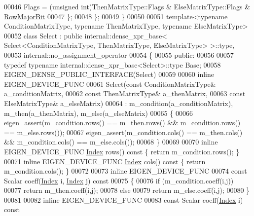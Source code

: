 \begin{DoxyCode}
00046     Flags = (\textcolor{keywordtype}{unsigned} int)ThenMatrixType::Flags & ElseMatrixType::Flags & 
      \hyperlink{group__flags_gae4f56c2a60bbe4bd2e44c5b19cbe8762}{RowMajorBit}
00047   \};
00048 \};
00049 \}
00050 
00051 \textcolor{keyword}{template}<\textcolor{keyword}{typename} ConditionMatrixType, \textcolor{keyword}{typename} ThenMatrixType, \textcolor{keyword}{typename} ElseMatrixType>
00052 \textcolor{keyword}{class }Select : \textcolor{keyword}{public} internal::dense\_xpr\_base< Select<ConditionMatrixType, ThenMatrixType, ElseMatrixType>
       >::type,
00053                internal::no\_assignment\_operator
00054 \{
00055   \textcolor{keyword}{public}:
00056 
00057     \textcolor{keyword}{typedef} \textcolor{keyword}{typename} internal::dense\_xpr\_base<Select>::type Base;
00058     EIGEN\_DENSE\_PUBLIC\_INTERFACE(Select)
00059 
00060     \textcolor{keyword}{inline} EIGEN\_DEVICE\_FUNC
00061     Select(\textcolor{keyword}{const} ConditionMatrixType& a\_conditionMatrix,
00062            \textcolor{keyword}{const} ThenMatrixType& a\_thenMatrix,
00063            \textcolor{keyword}{const} ElseMatrixType& a\_elseMatrix)
00064       : m\_condition(a\_conditionMatrix), m\_then(a\_thenMatrix), m\_else(a\_elseMatrix)
00065     \{
00066       eigen\_assert(m\_condition.rows() == m\_then.rows() && m\_condition.rows() == m\_else.rows());
00067       eigen\_assert(m\_condition.cols() == m\_then.cols() && m\_condition.cols() == m\_else.cols());
00068     \}
00069 
00070     \textcolor{keyword}{inline} EIGEN\_DEVICE\_FUNC \hyperlink{namespace_eigen_a62e77e0933482dafde8fe197d9a2cfde}{Index} rows()\textcolor{keyword}{ const }\{ \textcolor{keywordflow}{return} m\_condition.rows(); \}
00071     \textcolor{keyword}{inline} EIGEN\_DEVICE\_FUNC \hyperlink{namespace_eigen_a62e77e0933482dafde8fe197d9a2cfde}{Index} cols()\textcolor{keyword}{ const }\{ \textcolor{keywordflow}{return} m\_condition.cols(); \}
00072 
00073     \textcolor{keyword}{inline} EIGEN\_DEVICE\_FUNC
00074     \textcolor{keyword}{const} Scalar coeff(\hyperlink{namespace_eigen_a62e77e0933482dafde8fe197d9a2cfde}{Index} i, \hyperlink{namespace_eigen_a62e77e0933482dafde8fe197d9a2cfde}{Index} j)\textcolor{keyword}{ const}
00075 \textcolor{keyword}{    }\{
00076       \textcolor{keywordflow}{if} (m\_condition.coeff(i,j))
00077         \textcolor{keywordflow}{return} m\_then.coeff(i,j);
00078       \textcolor{keywordflow}{else}
00079         \textcolor{keywordflow}{return} m\_else.coeff(i,j);
00080     \}
00081 
00082     \textcolor{keyword}{inline} EIGEN\_DEVICE\_FUNC
00083     \textcolor{keyword}{const} Scalar coeff(\hyperlink{namespace_eigen_a62e77e0933482dafde8fe197d9a2cfde}{Index} i)\textcolor{keyword}{ const}

\end{DoxyCode}
